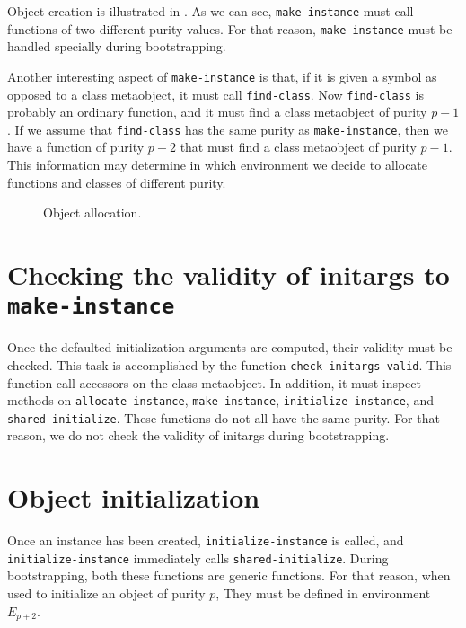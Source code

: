 Object creation is illustrated in .  As we
can see, \texttt{make-instance} must call functions of two different
purity values.  For that reason, \texttt{make-instance} must be
handled specially during bootstrapping.

Another interesting aspect of \texttt{make-instance} is that, if it is
given a symbol as opposed to a class metaobject, it must call
\texttt{find-class}.  Now \texttt{find-class} is probably an ordinary
function, and it must find a class metaobject of purity $p-1$.  If we
assume that \texttt{find-class} has the same purity as
\texttt{make-instance}, then we have a function of purity $p-2$ that
must find a class metaobject of purity $p-1$.  This information may
determine in which environment we decide to allocate functions and
classes of different purity.

\begin{figure}
\begin{center}
\end{center}
\caption{\label{fig-make-instance}
Object allocation.}
\end{figure}

\section{Checking the validity of initargs to \texttt{make-instance}}

Once the defaulted initialization arguments are computed, their
validity must be checked.  This task is accomplished by the function
\texttt{check-initargs-valid}.  This function call accessors on the
class metaobject.  In addition, it must inspect methods on
\texttt{allocate-instance}, \texttt{make-instance},
\texttt{initialize-instance}, and \texttt{shared-initialize}.
These functions do not all have the same purity.  For that reason, we
do not check the validity of initargs during bootstrapping.

\section{Object initialization}

Once an instance has been created, \texttt{initialize-instance} is
called, and \texttt{initialize-instance} immediately calls
\texttt{shared-initialize}.  During bootstrapping, both these
functions are generic functions.  For that reason, when used to
initialize an object of purity $p$,  They must be defined in
environment $E_{p+2}$.

